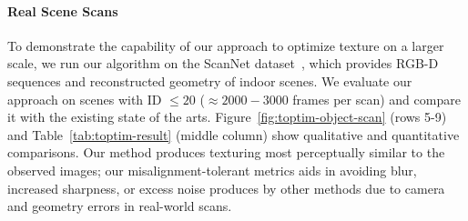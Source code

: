 \paragraph*{Real Scene Scans}
To demonstrate the capability of our approach to optimize texture on a larger scale, we run our algorithm on the ScanNet dataset~\cite{dai2017scannet}, which provides RGB-D sequences and reconstructed geometry of indoor scenes.
We evaluate our approach on scenes with ID $\leq 20$ ($\approx 2000-3000$ frames per scan) and compare it with the existing state of the arts. 
Figure~\ref{fig:toptim-object-scan} (rows 5-9) and Table~\ref{tab:toptim-result} (middle column) show qualitative and quantitative comparisons. 
Our method produces texturing most perceptually similar to the observed images; our misalignment-tolerant metrics aids in avoiding blur, increased sharpness, or excess noise produces by other methods due to camera and geometry errors in real-world scans.

